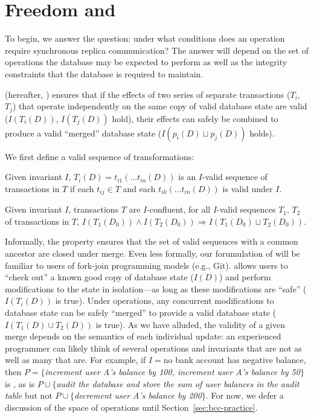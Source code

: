 
\section{Freedom and \iconfluence}
\label{sec:bcc-theory}

To begin, we answer the question: under what conditions does an
operation require synchronous replica communication? The answer will
depend on the set of operations the database may be expected to
perform as well as the integrity constraints that the database is
required to maintain.

\fullnameconfluence (hereafter, \iconfluence) ensures that if the
effects of two series of separate transactions ($T_i$, $T_j$) that
operate independently on the same copy of valid database state are
valid ($I(T_i(D))$, $I(T_j(D))$ hold), their effects can safely be
combined to produce a valid ``merged'' database state ($I(p_i(D)
\sqcup p_j(D))$ holds).

We first define a valid sequence of transformations:

\begin{definition}
Given invariant $I$, $T_i(D) = t_{i1}(\dots t_{in}(D))$ is an
$I$-valid sequence of transactions in $T$ if each $t_{ij} \in T$ and
each $t_{ik}(\dots t_{in}(D))$ is valid under $I$.
\end{definition}

\begin{definition}[\iconfluence]
Given invariant $I$, transactions $T$ are $I$-confluent, for all
$I$-valid sequences $T_1$, $T_2$ of transactions in $T$, $I(T_1(D_0))
\wedge I(T_2(D_0)) \Rightarrow I(T_1(D_0) \sqcup T_2(D_0))$.
\end{definition}

Informally, the \iconfluence property ensures that the set of valid
sequences with a common ancestor are closed under merge. Even less
formally, our forumulation of \iconfluence will be familiar to users
of fork-join programming models (e.g., Git). \iconfluence allows users
to ``check out'' a known good copy of database state ($I(D)$) and
perform modifications to the state in isolation---as long as these
modifications are ``safe'' ($I(T_i(D))$ is true). Under \iconfluent
operations, any concurrent modifications to database state can be
safely ``merged'' to provide a valid database state ($I(T_1(D) \cup
T_2(D))$ is true). As we have alluded, the validity of a given merge
depends on the semantics of each individual update: an experienced
programmer can likely think of several operations and invariants that
are not \iconfluent as well as many that are. For example, if $I=$no
bank account has negative balance, then $P=\{$\textit{increment user
  A's balance by 100, increment user A's balance by 50}$\}$ is
\iconfluent, as is $P\cup\{$\textit{audit the database and store the
  sum of user balances in the \textrm{audit} table} but not
$P\cup\{$\textit{decrement user A's balance by 200}$\}$. For now, we
defer a discussion of the space of operations until
Section~\ref{sec:bcc-practice}. 

